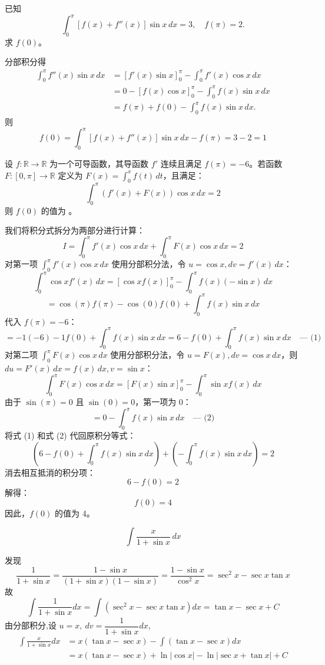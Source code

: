 \begin{questions}
    \question 已知
    \[
    \int_0^\pi \left[f(x) + f''(x)\right]\sin x \, dx = 3,\quad f(\pi) = 2.
    \]
    求 \( f(0) \)。
    \begin{solution}
        分部积分得
        \begin{align*}
        \int_0^\pi f''(x)\sin x\, dx 
        &= \left[ f'(x)\sin x \right]_0^\pi - \int_0^\pi f'(x)\cos x\, dx \\
        &= 0-\left[ f(x)\cos x \right]_0^\pi - \int_0^\pi f(x)\sin x\, dx \\
        &= f(\pi) + f(0) - \int_0^\pi f(x)\sin x\, dx.
        \end{align*}
        则
        \[
        f(0)=  \int_0^\pi \left[f(x) + f''(x)\right]\sin x \, dx-f(\pi) = 3-2=1
        \]
    \end{solution}

    \question
设 $f: \mathbb{R} \to \mathbb{R}$ 为一个可导函数，其导函数 $f'$ 连续且满足 $f(\pi) = -6$。若函数 $F: [0, \pi] \to \mathbb{R}$ 定义为 $F(x) = \int_0^x f(t) \,dt$，且满足：
\[
\int_0^\pi (f'(x) + F(x)) \cos x \,dx = 2
\]
则 $f(0)$ 的值为 \underline{\quad\quad}。

\begin{solution}
我们将积分式拆分为两部分进行计算：
\[
I = \int_0^\pi f'(x) \cos x \,dx + \int_0^\pi F(x) \cos x \,dx = 2
\]
对第一项 $\int_0^\pi f'(x) \cos x \,dx$ 使用分部积分法，令 $u = \cos x, dv = f'(x) \,dx$：
\[
\int_0^\pi \cos x f'(x) \,dx = [\cos x f(x)]_0^\pi - \int_0^\pi f(x) (-\sin x) \,dx
\]
\[
= \cos(\pi)f(\pi) - \cos(0)f(0) + \int_0^\pi f(x) \sin x \,dx
\]
代入 $f(\pi) = -6$：
\[
= -1(-6) - 1f(0) + \int_0^\pi f(x) \sin x \,dx = 6 - f(0) + \int_0^\pi f(x) \sin x \,dx \quad \text{--- (1)}
\]
对第二项 $\int_0^\pi F(x) \cos x \,dx$ 使用分部积分法，令 $u = F(x), dv = \cos x \,dx$，则 $du = F'(x) \,dx = f(x) \,dx, v = \sin x$：
\[
\int_0^\pi F(x) \cos x \,dx = [F(x) \sin x]_0^\pi - \int_0^\pi \sin x f(x) \,dx
\]
由于 $\sin(\pi) = 0$ 且 $\sin(0) = 0$，第一项为 0：
\[
= 0 - \int_0^\pi f(x) \sin x \,dx \quad \text{--- (2)}
\]
将式 (1) 和式 (2) 代回原积分等式：
\[
(6 - f(0) + \int_0^\pi f(x) \sin x \,dx) + (-\int_0^\pi f(x) \sin x \,dx) = 2
\]
消去相互抵消的积分项：
\[
6 - f(0) = 2
\]
解得：
\[
f(0) = 4
\]
因此，$f(0)$ 的值为 4。
\end{solution}

    \question
    \[
    \int \frac{x}{1+\sin x} \, dx
    \]
    \begin{solution}
        发现
        \[
        \frac{1}{1+\sin x}
        = \frac{1-\sin x}{(1+\sin x)(1-\sin x)}
        = \frac{1 - \sin x}{\cos^2 x}
        = \sec^2 x - \sec x \tan x
        \]
        故
        \[
        \int \frac{1}{1 + \sin x} dx = \int \left( \sec^2 x - \sec x \tan x \right) dx = \tan x - \sec x + C
        \]
        由分部积分,设 \( u = x,\ dv = \dfrac{1}{1+\sin x} dx, \)
        \begin{align*}
        \int \frac{x}{1+\sin x} dx 
        &= x(\tan x - \sec x) - \int (\tan x - \sec x) dx \\
        &= x(\tan x - \sec x) + \ln|\cos x| - \ln|\sec x + \tan x| + C
        \end{align*}
    \end{solution}


\end{questions}
